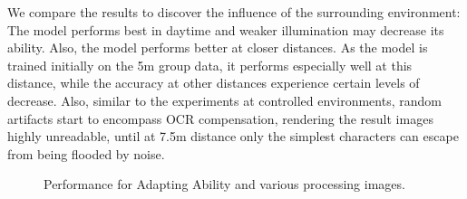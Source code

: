 
We compare the results to discover the influence of the surrounding environment: The model performs best in daytime and weaker illumination may decrease its ability. Also, the model performs better at closer distances. As the model is trained initially on the 5m group data, it performs especially well at this distance, while the accuracy at other distances experience certain levels of decrease. Also, similar to the experiments at controlled environments, random artifacts start to encompass OCR compensation, rendering the result images highly unreadable, until at 7.5m distance only the simplest characters can escape from being flooded by noise.

\begin{figure}[!t]
    \centering
    \hfill
    \caption{Performance for Adapting Ability and various processing images.}
    \label{fig:adapting}
\end{figure}

